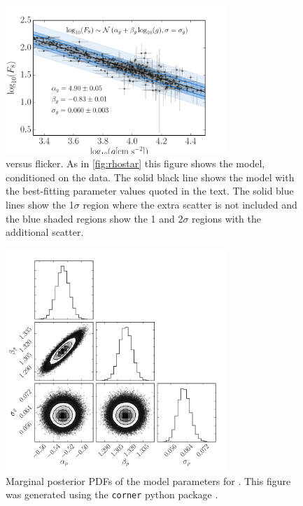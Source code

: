 \begin{figure}
\begin{center}
\includegraphics[width=8.4cm,angle=0,clip=true]{figures/flicker_vs_logg.pdf}
\caption[\logg versus flicker.]{
\logg versus flicker.
As in \ref{fig:rhostar} this figure shows the model, conditioned on the data.
The solid black line shows the model with the best-fitting parameter values
quoted in the text.
The solid blue lines show the 1$\sigma$ region where the extra scatter is not
included and the blue shaded regions show the 1 and 2$\sigma$ regions with the
additional scatter.}
\label{fig:logg}
\end{center}
\end{figure}

\begin{figure}
\begin{center}
\includegraphics[width=8.4cm,angle=0,clip=true]{figures/rho_triangle.pdf}
\caption[Marginal posterior PDFs for flicker versus \rhostar parameters.]
{Marginal posterior PDFs of the model parameters for \rhostar.
This figure was generated using the {\tt corner} python package
\citep{corner}.}
\label{fig:triangle}
\end{center}
\end{figure}

